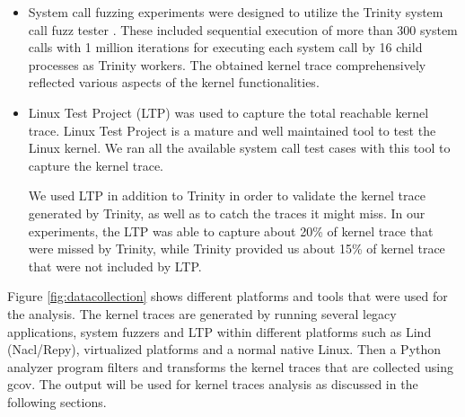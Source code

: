 \begin{itemize}
\item System call fuzzing experiments were designed to utilize the Trinity
 system call fuzz tester \cite{Trinity}. These included sequential execution of more than 300 system calls with 1 million iterations for executing each system call by 16 child processes as Trinity workers. The obtained kernel trace comprehensively reflected various aspects of the kernel functionalities.


\item Linux Test Project (LTP) \cite{LTP} was used to capture the total reachable kernel trace.
Linux Test Project is a mature and well maintained tool to test the Linux
kernel.
We ran all the available system call test cases with this tool to capture
the kernel trace.

We used LTP in addition to Trinity in order to validate the kernel trace generated
by Trinity, as well as to catch the traces it might miss.
In our experiments, the LTP was able to capture about 20\% of kernel trace
that were missed by Trinity, while Trinity provided us about 15\% of kernel trace
that were not included by LTP.
\end{itemize}

Figure \ref{fig:datacollection} shows different platforms and tools that were used
 for the analysis. The kernel traces are generated by running several legacy
  applications, system fuzzers and LTP within different platforms such as
  Lind (Nacl/Repy), virtualized platforms and a normal native Linux. Then a Python
   analyzer program filters and transforms the kernel traces that are collected
    using gcov. The output will be used for kernel traces analysis as
    discussed in the following sections.

